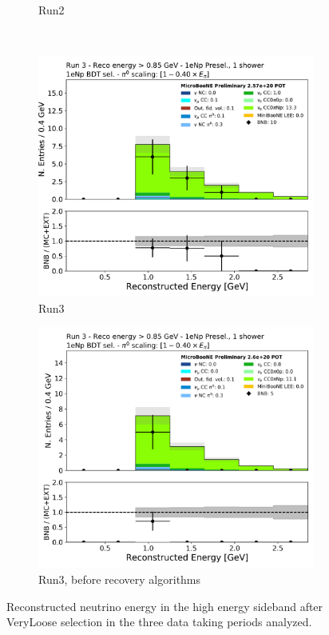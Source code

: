 \begin{figure}[H]
\begin{center}
\begin{subfigure}{0.4\textwidth}
    \caption{Run2}
    \end{subfigure}\\
    \begin{subfigure}{0.4\textwidth}
    \includegraphics[width=1.00\textwidth]{Sidebands/Figures/1eNp/TimeDependence/reco_e_coarse_HE_NPBDT_Run3.pdf}
    \caption{Run3}
    \end{subfigure}
    \begin{subfigure}{0.4\textwidth}
    \includegraphics[width=1.00\textwidth]{Sidebands/Figures/1eNp/TimeDependence/reco_e_coarse_HE_NPBDT_Run3_noRecAlg.png}
    \caption{Run3, before recovery algorithms}
    \end{subfigure}
    \caption{\label{fig:sb:1eNp:time:he:bdt:recoe} Reconstructed neutrino energy in the \npsel high energy sideband after VeryLoose selection in the three data taking periods analyzed.}
    \end{center}
\end{figure}

